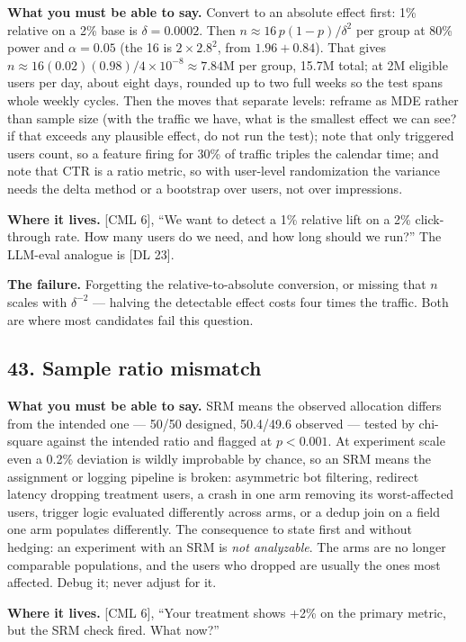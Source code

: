 \textbf{What you must be able to say.} Convert to an absolute effect first: 1\% relative on a 2\% base is $\delta = 0.0002$. Then $n \approx 16\,p(1-p)/\delta^2$ per group at 80\% power and $\alpha = 0.05$ (the 16 is $2 \times 2.8^2$, from $1.96 + 0.84$). That gives $n \approx 16(0.02)(0.98)/4\times10^{-8} \approx 7.84$M per group, 15.7M total; at 2M eligible users per day, about eight days, rounded up to two full weeks so the test spans whole weekly cycles. Then the moves that separate levels: reframe as MDE rather than sample size (with the traffic we have, what is the smallest effect we can see? if that exceeds any plausible effect, do not run the test); note that only triggered users count, so a feature firing for 30\% of traffic triples the calendar time; and note that CTR is a ratio metric, so with user-level randomization the variance needs the delta method or a bootstrap over users, not over impressions.

\textbf{Where it lives.} [CML 6], ``We want to detect a 1\% relative lift on a 2\% click-through rate. How many users do we need, and how long should we run?'' The LLM-eval analogue is [DL 23].

\textbf{The failure.} Forgetting the relative-to-absolute conversion, or missing that $n$ scales with $\delta^{-2}$ --- halving the detectable effect costs four times the traffic. Both are where most candidates fail this question.

\subsection*{43. Sample ratio mismatch}

\textbf{What you must be able to say.} SRM means the observed allocation differs from the intended one --- 50/50 designed, 50.4/49.6 observed --- tested by chi-square against the intended ratio and flagged at $p < 0.001$. At experiment scale even a 0.2\% deviation is wildly improbable by chance, so an SRM means the assignment or logging pipeline is broken: asymmetric bot filtering, redirect latency dropping treatment users, a crash in one arm removing its worst-affected users, trigger logic evaluated differently across arms, or a dedup join on a field one arm populates differently. The consequence to state first and without hedging: an experiment with an SRM is \emph{not analyzable}. The arms are no longer comparable populations, and the users who dropped are usually the ones most affected. Debug it; never adjust for it.

\textbf{Where it lives.} [CML 6], ``Your treatment shows +2\% on the primary metric, but the SRM check fired. What now?''

